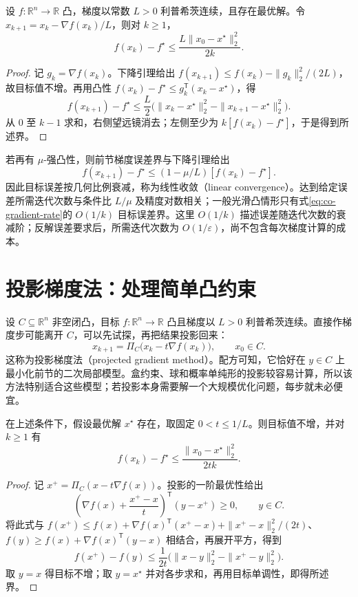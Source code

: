\documentclass[UTF8,12pt,a4paper,fontset=fandol]{ctexbook}
\begin{document}
\begin{theorem}[光滑凸情形的目标误差界]
设 $f:\mathbb R^n\to\mathbb R$ 凸，梯度以常数 $L>0$ 利普希茨连续，且存在最优解。令 $x_{k+1}=x_k-\nabla f(x_k)/L$，则对 $k\geq1$，
\begin{equation}
 f(x_k)-f^\star\leq\frac{L\|x_0-x^\star\|_2^2}{2k}.
 \label{eq:co-gradient-rate}
\end{equation}
\end{theorem}
\begin{proof}
记 $g_k=\nabla f(x_k)$。下降引理给出 $f(x_{k+1})\leq f(x_k)-\|g_k\|_2^2/(2L)$，故目标值不增。再用凸性 $f(x_k)-f^\star\leq g_k^{\mathsf T}(x_k-x^\star)$，得
\[
 f(x_{k+1})-f^\star
 \leq\frac L2\bigl(\|x_k-x^\star\|_2^2-\|x_{k+1}-x^\star\|_2^2\bigr).
\]
从 $0$ 至 $k-1$ 求和，右侧望远镜消去；左侧至少为 $k[f(x_k)-f^\star]$，于是得到所述界。
\end{proof}

若再有 $\mu$-强凸性，则前节梯度误差界与下降引理给出
\[
 f(x_{k+1})-f^\star\leq(1-\mu/L)[f(x_k)-f^\star].
\]
因此目标误差按几何比例衰减，称为线性收敛（linear convergence）。达到给定误差所需迭代次数与条件比 $L/\mu$ 及精度对数相关；一般光滑凸情形只有式\eqref{eq:co-gradient-rate}的 $O(1/k)$ 目标误差界。这里 $O(1/k)$ 描述误差随迭代次数的衰减阶；反解误差要求后，所需迭代次数为 $O(1/\varepsilon)$，尚不包含每次梯度计算的成本。

\section{投影梯度法：处理简单凸约束}
\label{sec:co-projected-gradient}

设 $C\subseteq\mathbb R^n$ 非空闭凸，目标 $f:\mathbb R^n\to\mathbb R$ 凸且梯度以 $L>0$ 利普希茨连续。直接作梯度步可能离开 $C$，可以先试探，再把结果投影回来：
\begin{equation}
 x_{k+1}=\Pi_C\bigl(x_k-t\nabla f(x_k)\bigr),\qquad x_0\in C.
 \label{eq:co-projected-gradient}
\end{equation}
这称为投影梯度法（projected gradient method）。配方可知，它恰好在 $y\in C$ 上最小化前节的二次局部模型。盒约束、球和概率单纯形的投影较容易计算，所以该方法特别适合这些模型；若投影本身需要解一个大规模优化问题，每步就未必便宜。

\begin{proposition}[投影梯度法的下降与误差界]
在上述条件下，假设最优解 $x^\star$ 存在，取固定 $0<t\leq1/L$。则目标值不增，并对 $k\geq1$ 有
\[
 f(x_k)-f^\star\leq\frac{\|x_0-x^\star\|_2^2}{2tk}.
\]
\end{proposition}
\begin{proof}
记 $x^+=\Pi_C(x-t\nabla f(x))$。投影的一阶最优性给出
\[
 \left(\nabla f(x)+\frac{x^+-x}{t}\right)^{\mathsf T}(y-x^+)\geq0,
 \qquad y\in C.
\]
将此式与 $f(x^+)\leq f(x)+\nabla f(x)^{\mathsf T}(x^+-x)+\|x^+-x\|_2^2/(2t)$、$f(y)\geq f(x)+\nabla f(x)^{\mathsf T}(y-x)$ 相结合，再展开平方，得到
\begin{equation}
 f(x^+)-f(y)\leq\frac1{2t}
 \bigl(\|x-y\|_2^2-\|x^+-y\|_2^2\bigr).
 \label{eq:co-projected-three-point}
\end{equation}
取 $y=x$ 得目标不增；取 $y=x^\star$ 并对各步求和，再用目标单调性，即得所述界。
\end{proof}
\end{document}
